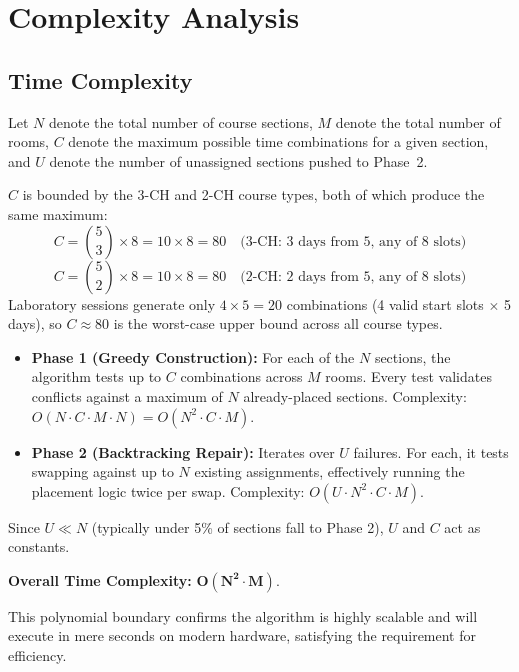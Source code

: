 \documentclass[12pt, a4paper]{article}
\begin{document}
\section{Complexity Analysis}

\subsection{Time Complexity}

Let $N$ denote the total number of course sections, $M$ denote the total number of
rooms, $C$ denote the maximum possible time combinations for a given section, and $U$
denote the number of unassigned sections pushed to Phase~2.

$C$ is bounded by the 3-CH and 2-CH course types, both of which produce the same
maximum:
$$C = \binom{5}{3} \times 8 = 10 \times 8 = 80 \quad \text{(3-CH: 3 days from 5, any of 8 slots)}$$
$$C = \binom{5}{2} \times 8 = 10 \times 8 = 80 \quad \text{(2-CH: 2 days from 5, any of 8 slots)}$$
Laboratory sessions generate only $4 \times 5 = 20$ combinations (4 valid start slots
$\times$ 5 days), so $C \approx 80$ is the worst-case upper bound across all course types.

\begin{itemize}[topsep=4pt]
    \item \textbf{Phase 1 (Greedy Construction):} For each of the $N$ sections, the
          algorithm tests up to $C$ combinations across $M$ rooms. Every test validates
          conflicts against a maximum of $N$ already-placed sections. Complexity:
          $O(N \cdot C \cdot M \cdot N) = O(N^2 \cdot C \cdot M)$.

    \item \textbf{Phase 2 (Backtracking Repair):} Iterates over $U$ failures. For each,
          it tests swapping against up to $N$ existing assignments, effectively running
          the placement logic twice per swap. Complexity: $O(U \cdot N^2 \cdot C \cdot M)$.
\end{itemize}

Since $U \ll N$ (typically under 5\% of sections fall to Phase 2), $U$ and $C$ act as
constants.

\medskip
\noindent\textbf{Overall Time Complexity:} $\mathbf{O(N^2 \cdot M)}$.

\medskip
\noindent This polynomial boundary confirms the algorithm is highly scalable and will
execute in mere seconds on modern hardware, satisfying the requirement for efficiency.
\end{document}
